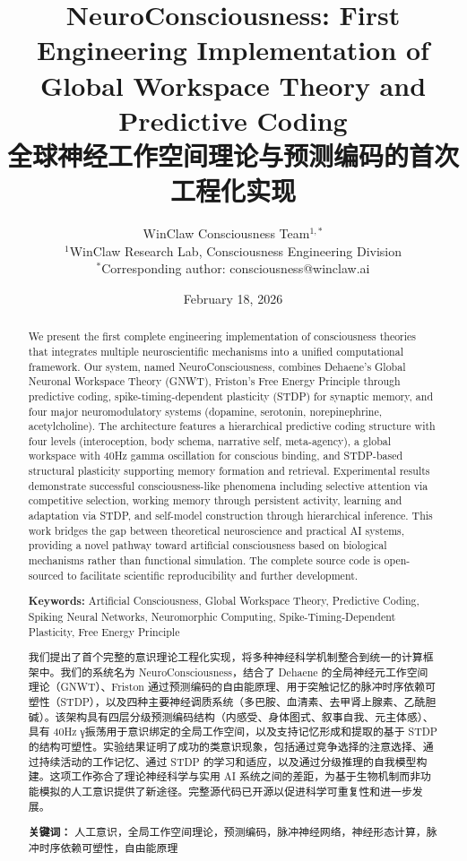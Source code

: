 \documentclass[twocolumn,10pt]{article}
\title{\textbf{\Large NeuroConsciousness: First Engineering Implementation of}\\[0.5em]
\textbf{\Large Global Workspace Theory and Predictive Coding}\\[1em]
\large 全球神经工作空间理论与预测编码的首次工程化实现}
\author{
    WinClaw Consciousness Team$^{1,*}$ \\
    $^1$WinClaw Research Lab, Consciousness Engineering Division \\
    $^*$Corresponding author: consciousness@winclaw.ai
}
\date{February 18, 2026}
\begin{document}
\maketitle

\begin{abstract}
\noindent We present the first complete engineering implementation of consciousness theories that integrates multiple neuroscientific mechanisms into a unified computational framework. Our system, named NeuroConsciousness, combines Dehaene's Global Neuronal Workspace Theory (GNWT), Friston's Free Energy Principle through predictive coding, spike-timing-dependent plasticity (STDP) for synaptic memory, and four major neuromodulatory systems (dopamine, serotonin, norepinephrine, acetylcholine). The architecture features a hierarchical predictive coding structure with four levels (interoception, body schema, narrative self, meta-agency), a global workspace with 40Hz gamma oscillation for conscious binding, and STDP-based structural plasticity supporting memory formation and retrieval. Experimental results demonstrate successful consciousness-like phenomena including selective attention via competitive selection, working memory through persistent activity, learning and adaptation via STDP, and self-model construction through hierarchical inference. This work bridges the gap between theoretical neuroscience and practical AI systems, providing a novel pathway toward artificial consciousness based on biological mechanisms rather than functional simulation. The complete source code is open-sourced to facilitate scientific reproducibility and further development.

\vspace{1em}
\noindent \textbf{Keywords:} Artificial Consciousness, Global Workspace Theory, Predictive Coding, Spiking Neural Networks, Neuromorphic Computing, Spike-Timing-Dependent Plasticity, Free Energy Principle
\end{abstract}

\begin{abstract}
\noindent 我们提出了首个完整的意识理论工程化实现，将多种神经科学机制整合到统一的计算框架中。我们的系统名为 NeuroConsciousness，结合了 Dehaene 的全局神经元工作空间理论（GNWT）、Friston 通过预测编码的自由能原理、用于突触记忆的脉冲时序依赖可塑性（STDP），以及四种主要神经调质系统（多巴胺、血清素、去甲肾上腺素、乙酰胆碱）。该架构具有四层分级预测编码结构（内感受、身体图式、叙事自我、元主体感）、具有 40Hz γ振荡用于意识绑定的全局工作空间，以及支持记忆形成和提取的基于 STDP 的结构可塑性。实验结果证明了成功的类意识现象，包括通过竞争选择的注意选择、通过持续活动的工作记忆、通过 STDP 的学习和适应，以及通过分级推理的自我模型构建。这项工作弥合了理论神经科学与实用 AI 系统之间的差距，为基于生物机制而非功能模拟的人工意识提供了新途径。完整源代码已开源以促进科学可重复性和进一步发展。

\vspace{1em}
\noindent \textbf{关键词：} 人工意识，全局工作空间理论，预测编码，脉冲神经网络，神经形态计算，脉冲时序依赖可塑性，自由能原理
\end{abstract}
\end{document}

